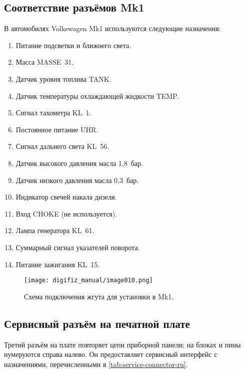 \subsection{Соответствие разъёмов Mk1}
В автомобилях Volkswagen Mk1 используются следующие назначения:
\begin{enumerate}
    \item Питание подсветки и ближнего света.
    \item Масса MASSE~31.
    \item Датчик уровня топлива TANK.
    \item Датчик температуры охлаждающей жидкости TEMP.
    \item Сигнал тахометра KL~1.
    \item Постоянное питание UHR.
    \item Сигнал дальнего света KL~56.
    \item Датчик высокого давления масла 1,8~бар.
    \item Датчик низкого давления масла 0,3~бар.
    \item Индикатор свечей накала дизеля.
    \item Вход CHOKE (не используется).
    \item Лампа генератора KL~61.
    \item Суммарный сигнал указателей поворота.
    \item Питание зажигания KL~15.
\end{enumerate}
\begin{figure}[htbp]
    \centering
    \texttt{[image: digifiz\_manual/image010.png]}
    \caption{Схема подключения жгута для установки в Mk1.}
\end{figure}

\subsection{Сервисный разъём на печатной плате}
Третий разъём на плате повторяет цепи приборной панели; на блоках \ReplicaGenOneShort{} и \ReplicaNextShort{} пины нумеруются справа налево.
Он предоставляет сервисный интерфейс с назначениями, перечисленными в \autoref{tab:service-connector-ru}.

